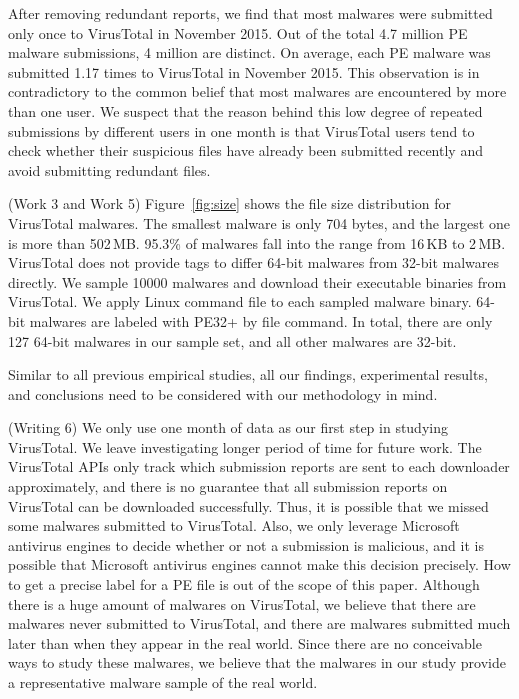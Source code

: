 After removing redundant reports, we find that most malwares were submitted only once to VirusTotal in November 2015. 
Out of the total 4.7 million PE malware submissions, 4 million are distinct. 
On average, each PE malware was submitted 1.17 times to VirusTotal in November 2015. 
This observation is in contradictory to the common belief that most malwares are encountered by more than one user.
We suspect that the reason behind this low degree of repeated submissions by different users in one month
is that VirusTotal users
tend to check whether their suspicious files have already been submitted recently
and avoid submitting redundant files.

{\color{red} (Work 3 and Work 5)
Figure~\ref{fig:size} shows the file size distribution for VirusTotal malwares. 
The smallest malware is only 704 bytes, and the largest one is more than 502\,MB. 
95.3\% of malwares fall into the range from 16\,KB to 2\,MB. 
VirusTotal does not provide tags to differ 64-bit malwares from 32-bit malwares directly. 
We sample 10000 malwares and download their executable binaries from VirusTotal.
We apply Linux command file to each sampled malware binary. 
64-bit malwares are labeled with PE32+ by file command. 
In total, there are only 127 64-bit malwares in our sample set, and all other malwares are 32-bit.
}

Similar to all previous empirical studies, all our findings, experimental results, 
and conclusions need to be considered with our methodology in mind. 

{\color{red} (Writing 6)
We only use one month of data as our first step in studying VirusTotal. 
We leave investigating longer period of time for future work. 
}
The VirusTotal APIs only track which submission reports are sent to each downloader approximately, 
and there is no guarantee that all submission reports on VirusTotal can be downloaded successfully. 
Thus, it is possible that we missed some malwares submitted to VirusTotal. 
Also, we only leverage Microsoft antivirus engines to decide whether or not a submission is malicious, 
and it is possible that Microsoft antivirus engines cannot make this decision precisely. 
How to get a precise label for a PE file is out of the scope of this paper.  
Although there is a huge amount of malwares on VirusTotal, we believe that there are malwares never submitted to VirusTotal, 
and there are malwares submitted much later than when they appear in the real world.
Since there are no conceivable ways to study these malwares,
we believe that the malwares in our study provide a representative malware sample of the real world. 



